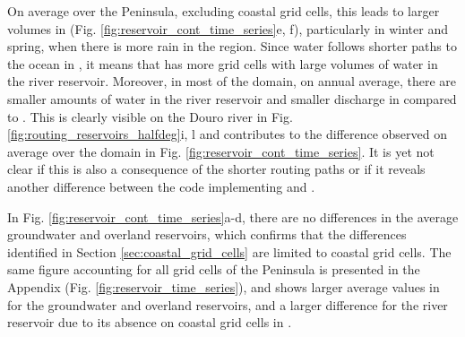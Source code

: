 On average over the Peninsula, excluding coastal grid cells, this leads to larger volumes in \std (Fig. \ref{fig:reservoir_cont_time_series}e, f), particularly in winter and spring, when there is more rain in the region. Since water follows shorter paths to the ocean in \native, it means that \std has more grid cells with large volumes of water in the river reservoir.
Moreover, in most of the domain, on annual average, there are smaller amounts of water in the river reservoir and smaller discharge in \native compared to \std. This is clearly visible on the Douro river in Fig. \ref{fig:routing_reservoirs_halfdeg}i, l and contributes to the difference observed on average over the domain in Fig. \ref{fig:reservoir_cont_time_series}. It is yet not clear if this is also a consequence of the shorter routing paths or if it reveals another difference between the code implementing \std and \native.

In Fig. \ref{fig:reservoir_cont_time_series}a-d, there are no differences in the average groundwater and overland reservoirs, which confirms that the differences identified in Section \ref{sec:coastal_grid_cells} are limited to coastal grid cells.
The same figure accounting for all grid cells of the Peninsula is presented in the Appendix (Fig. \ref{fig:reservoir_time_series}), and shows larger average values in \native for the groundwater and overland reservoirs, and a larger difference for the river reservoir due to its absence on coastal grid cells in \native.

